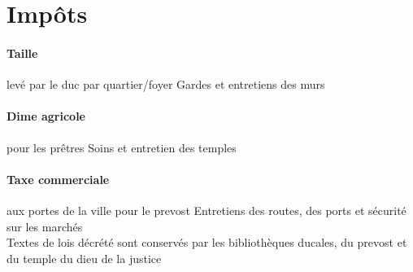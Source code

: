 \section{Impôts}
  \paragraph{Taille} levé par le duc par quartier/foyer
    Gardes et entretiens des murs \\
  \paragraph{Dime agricole} pour les prêtres
    Soins et entretien des temples \\
  \paragraph{Taxe commerciale} aux portes de la ville pour le prevost
    Entretiens des routes, des ports et sécurité sur les marchés \\

Textes de lois décrété sont conservés par les bibliothèques ducales, 
du prevost et du temple du dieu de la justice \\
